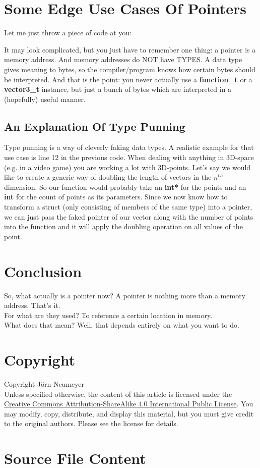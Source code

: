 \documentclass{article}
\begin{document}
  \section{Some Edge Use Cases Of Pointers}
  Let me just throw a piece of code at you:
  
  It may look complicated, but you just have to remember one thing: a pointer is a memory address.
  And memory addresses do NOT have TYPES.
  A data type gives meaning to bytes, so the compiler/program knows how certain bytes should be interpreted.
  And that is the point: you never actually use a \textbf{function\_t} or a \textbf{vector3\_t} instance, but just a bunch of bytes which are interpreted in a (hopefully) useful manner.
  \subsection{An Explanation Of Type Punning}
  Type punning is a way of cleverly faking data types.
  A realistic example for that use case is line 12 in the previous code.
  When dealing with anything in 3D-space (e.g. in a video game) you are working a lot with 3D-points.
  Let's say we would like to create a generic way of doubling the length of vectors in the $n^t$$^h$ dimension.
  So our function would probably take an \textbf{int*} for the points and an \textbf{int} for the count of points as its parameters.
  Since we now know how to transform a struct (only consisting of members of the same type) into a pointer, we can just pass the faked pointer of our vector along with the number of points into the function and it will apply the doubling operation on all values of the point.
  \section{Conclusion}
  So, what actually is a pointer now?
  A pointer is nothing more than a memory address.
  That's it.
  \\For what are they used?
  To reference a certain location in memory.
  \\What does that mean?
  Well, that depends entirely on what you want to do.
  
  \section{Copyright}
  Copyright \textcopyright {} J\"orn Neumeyer\\
  Unless specified otherwise, the content of this article is licensed under the \href{https://creativecommons.org/licenses/by-sa/4.0/legalcode}{Creative Commons Attribution-ShareAlike 4.0 International Public License}.
  You may modify, copy, distribute, and display this material, but you must give credit to the original authors. Please see the license for details.
  \section{Source File Content}
  
\end{document}
